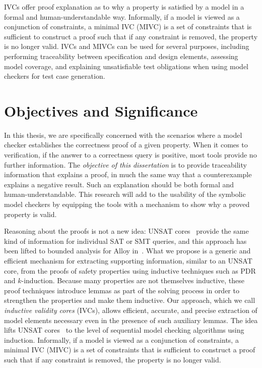 IVCs offer proof explanation as to why a property is satisfied by a model in a formal and human-understandable way. Informally, if a model is viewed as a conjunction of constraints,
a minimal IVC (MIVC) is a set of constraints that is sufficient to construct a proof such that if any constraint is removed, the property is no longer valid. 
IVCs and MIVCs can be used for several purposes, including performing traceability between specification and design elements, assessing model coverage, and explaining unsatisfiable test obligations when using model checkers for test case generation.


\section{Objectives and Significance}
\label{sec:obj}
In this thesis, we are specifically concerned with the scenarios where a model checker establishes the correctness proof of a given property.
 When it comes to verification, if the answer to a correctness query is positive, most tools provide no further information.  The \textit{objective of this dissertation} is to provide traceability information that explains a proof, in much the same way that a counterexample explains a negative result.
Such an explanation should be both formal and human-understandable. This research will add to the usability of the symbolic model checkers by equipping the tools with a mechanism to show why a proved property is valid. 

Reasoning about the proofs is not a new idea: UNSAT cores~\cite{zhang2003extracting}
provide the same kind of information for individual SAT or
SMT queries, and this approach has been lifted to bounded analysis
for Alloy in~\cite{Torlak08:cores}.
What we propose is a generic and efficient
mechanism for extracting supporting information, similar to an UNSAT
core, from the proofs of safety properties using inductive techniques
such as PDR and $k$-induction. Because many
properties are not themselves inductive, these proof techniques
introduce lemmas as part of the solving process in order to strengthen
the properties and make them inductive. Our approach, which we call {\em inductive validity cores} (IVCs), allows efficient, accurate, and precise extraction of model elements necessary even in the presence of such auxiliary lemmas. The idea lifts UNSAT cores~\cite{zhang2003extracting}
to the level of sequential model checking algorithms using induction.  Informally, if a model is viewed as a conjunction of constraints,
a minimal IVC (MIVC) is a set of constraints that is sufficient to construct a proof such that if any constraint is removed, the property is no longer valid.



